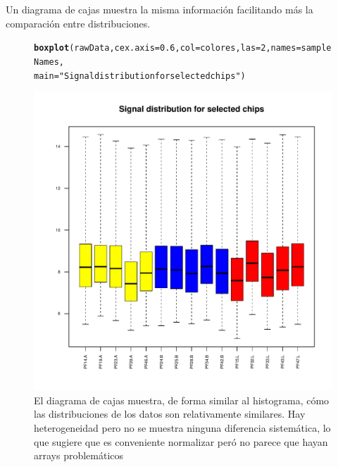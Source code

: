 \documentclass[a4paper]{article}\usepackage[]{graphicx}\usepackage[]{color}
\makeatletter
\def\maxwidth{ %
  \ifdim\Gin@nat@width>\linewidth
    \linewidth
  \else
    \Gin@nat@width
  \fi
}
\newcommand{\hlnum}[1]{\textcolor[rgb]{0.686,0.059,0.569}{#1}}%
\newcommand{\hlstr}[1]{\textcolor[rgb]{0.192,0.494,0.8}{#1}}%
\newcommand{\hlstd}[1]{\textcolor[rgb]{0.345,0.345,0.345}{#1}}%
\newcommand{\hlkwc}[1]{\textcolor[rgb]{0.333,0.667,0.333}{#1}}%
\newcommand{\hlkwd}[1]{\textcolor[rgb]{0.737,0.353,0.396}{\textbf{#1}}}%
\newenvironment{kframe}{%
 \def\at@end@of@kframe{}%
 \ifinner\ifhmode%
  \def\at@end@of@kframe{\end{minipage}}%
  \begin{minipage}{\columnwidth}%
 \fi\fi%
 \def\FrameCommand##1{\hskip\@totalleftmargin \hskip-\fboxsep
 \colorbox{shadecolor}{##1}\hskip-\fboxsep
     \hskip-\linewidth \hskip-\@totalleftmargin \hskip\columnwidth}%
 \MakeFramed {\advance\hsize-\width
   \@totalleftmargin\z@ \linewidth\hsize
   \@setminipage}}%
 {\par\unskip\endMakeFramed%
 \at@end@of@kframe}
\newenvironment{knitrout}{}{} %
\makeatother
\begin{document}
Un diagrama de cajas muestra la misma información facilitando más la comparaci\'on entre distribuciones.
  
\begin{figure}[htbp]
\centering
\begin{knitrout}
\color{fgcolor}\begin{kframe}
\begin{alltt}
\hlkwd{boxplot}\hlstd{(rawData,} \hlkwc{cex.axis}\hlstd{=}\hlnum{0.6}\hlstd{,} \hlkwc{col}\hlstd{=colores,} \hlkwc{las}\hlstd{=}\hlnum{2}\hlstd{,} \hlkwc{names}\hlstd{=sampleNames,}
        \hlkwc{main}\hlstd{=}\hlstr{"Signal distribution for selected chips"}\hlstd{)}
\end{alltt}
\end{kframe}
\includegraphics[width=\maxwidth]{images/graficboxplot-1} 

\end{knitrout}
  \caption{El diagrama de cajas muestra, de forma similar al histograma, cómo las distribuciones de los datos son relativamente similares. Hay heterogeneidad pero no se muestra ninguna diferencia sistemática, lo que sugiere que es conveniente normalizar peró no parece que hayan arrays problemáticos}
  \label{fig:boxplot}
\end{figure}
\end{document}
